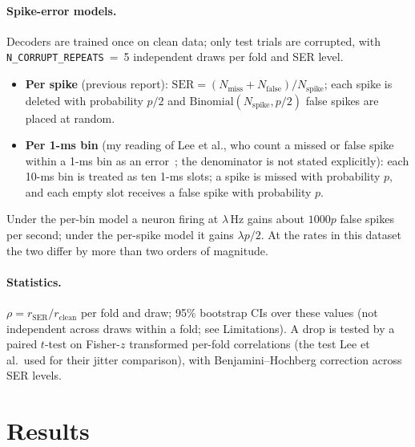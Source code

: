 \documentclass[11pt,a4paper]{article}
\begin{document}
\paragraph{Spike-error models.}\label{sec:ser}
Decoders are trained once on clean data; only test trials are corrupted, with \texttt{N\_CORRUPT\_REPEATS}~=~5
independent draws per fold and SER level.
\begin{itemize}
  \item \textbf{Per spike} (previous report): $\mathrm{SER}=(N_{\mathrm{miss}}+N_{\mathrm{false}})/N_{\mathrm{spike}}$;
  each spike is deleted with probability $p/2$ and $\mathrm{Binomial}(N_{\mathrm{spike}},p/2)$ false spikes are placed at random.
  \item \textbf{Per 1-ms bin} (my reading of Lee et al., who count a missed or false spike within a 1-ms bin as an
  error~\cite{lee2024}; the denominator is not stated explicitly): each 10-ms bin is treated as ten 1-ms slots; a
  spike is missed with probability $p$, and each empty slot receives a false spike with probability $p$.
\end{itemize}
Under the per-bin model a neuron firing at $\lambda$\,Hz gains about $1000p$ false spikes per second; under the
per-spike model it gains $\lambda p/2$. At the rates in this dataset the two differ by more than two orders of magnitude.

\paragraph{Statistics.} $\rho=r_{\mathrm{SER}}/r_{\mathrm{clean}}$ per fold and draw; 95\% bootstrap CIs over these
values (not independent across draws within a fold; see Limitations). A drop is tested by a paired $t$-test on Fisher-$z$ transformed per-fold correlations (the test Lee et al.\ used for their jitter comparison),
with Benjamini--Hochberg correction across SER levels.

\section{Results}
\end{document}

